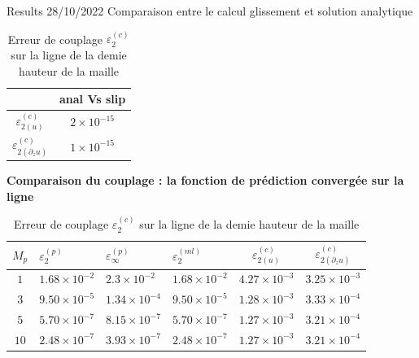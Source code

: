 \documentclass[aspect ratio=169,t]{beamer}
\numberwithin{equation}{section} %
\begin{document}
\begin{frame}{Results 28/10/2022}
{Comparaison entre le calcul glissement et solution analytique}
\begin{table}[!ht]
    \centering
    \begin{tabular}{c|c}
    \hline
                                &anal Vs slip  \\
    \hline
       $\varepsilon_{2 {(u)}}^{(c)}$    & $2\times 10^{-15}$  \\
       $\varepsilon_{2 {(\partial_z u)}}^{(c)}$ & $1\times 10^{-15}$ \\
    \hline
    \end{tabular}
    \caption{Erreur de couplage $\varepsilon_{2}^{(c)}$ sur la ligne de la demie hauteur de la maille}
    \label{tab:anal_slip_comp}
\end{table}
\textbf{Comparaison du couplage : la fonction de prédiction convergée sur la ligne}
\begin{table}[!ht]
    \centering
    \begin{tabular}{c|lll|cc}
    \hline
            $M_p$ & $\varepsilon_{2}^{(p)}$ & $\varepsilon_{\infty}^{(p)}$ &$\varepsilon_{2}^{(ml)}$ &$\varepsilon_{2 {(u)}}^{(c)}$&$\varepsilon_{2 {(\partial_z u)}}^{(c)}$ \\
    \hline
    $1$ & $1.68\times 10^{-2}$ & $2.3\times 10^{-2}$ & $1.68\times 10^{-2}$  & $4.27\times 10^{-3}$  & $3.25\times 10^{-3}$ \\
    $3$ & $9.50\times 10^{-5}$ & $1.34\times 10^{-4}$ & $9.50\times 10^{-5}$ & $1.28\times 10^{-3}$  & $3.33\times 10^{-4}$ \\
    $5$ & $5.70\times 10^{-7}$ & $8.15\times 10^{-7}$ & $5.70\times 10^{-7}$ & $1.27\times 10^{-3}$  & $3.21\times 10^{-4}$ \\
    $10$ & $2.48\times 10^{-7}$ & $3.93\times 10^{-7}$ & $2.48\times 10^{-7}$ & $1.27\times 10^{-3}$  & $3.21\times 10^{-4}$ \\
    \hline
    \end{tabular}
    \caption{Erreur de couplage $\varepsilon_{2}^{(c)}$ sur la ligne de la demie hauteur de la maille}
    \label{tab:ml_anal_slip_comp}
\end{table}
\end{frame}
\end{document}
